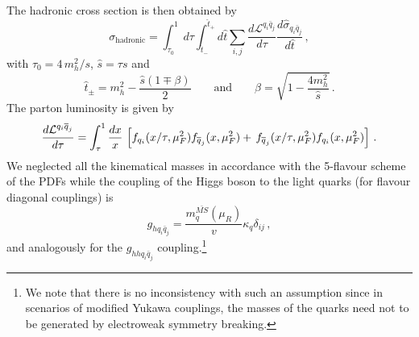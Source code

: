 The hadronic cross section is then obtained by
\begin{equation}
	\sigma_{\mathrm{hadronic}} =  \int_{\tau_0}^1 d\tau \int_{\hat{t}_-}^{\hat{t}_+} d\hat{t} \sum_{i,j} \frac{d\mathcal{L}^{q_i\bar{q}_j}}{d\tau}\frac{ d\hat \sigma_{q_i\bar{q}_j}}{d \hat t}\,, \label{eq:sigmahadron}
\end{equation}
with $ \tau_0= 4\, m_h^2/s$, $\hat{s}=\tau s$ and
\begin{equation}
	\hat{t}_{\pm}=m_h^2-\frac{\hat{s}(1\mp \beta)}{2} \quad\quad \text{and}\quad \quad \beta=\sqrt{1-\frac{4 m_h^2}{\hat{s}}}\,.
\end{equation}
The parton luminosity is given by
\begin{equation}
	\frac{d{\cal L}^{q_i \bar q_j}}{d\tau} = \int_\tau ^1 \frac{dx}{x} \,\left[  f_{q_i}(x/\tau,\mu_F^2) f_{\bar{q}_j}(x,\mu_F^2) + \,f_{\bar{q}_j}(x/\tau,\mu_F^2) f_{q_i}(x,\mu_F^2)\right]\,.
\end{equation}
We neglected all the kinematical masses in accordance with the 5-flavour scheme of the PDFs while the coupling of the Higgs boson to the light quarks (for flavour diagonal couplings) is
\begin{equation}
	g_{hq_i\bar{q}_j}=\frac{m^{\bar{MS}}_q(\mu_R)}{v}  \kappa_q \delta_{ij}\,,
\end{equation}
and analogously for the $g_{hhq_i\bar{q}_j}$ coupling.\footnote{We note that there is no inconsistency with such an assumption since in scenarios of modified Yukawa couplings, the masses of the quarks need not to be generated by electroweak symmetry breaking.}
%
